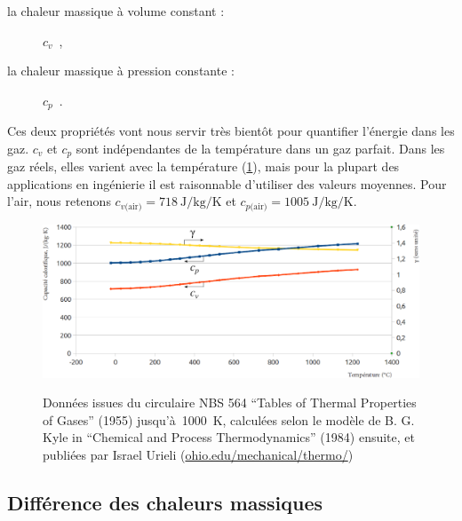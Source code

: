 		\begin{description}
			\item[la chaleur massique à volume constant :]$c_v$~, \dontbreakpage
			\item[la chaleur massique à pression constante :]$c_p$~.
		\end{description}

		Ces deux propriétés vont nous servir très bientôt pour quantifier l’énergie dans les gaz. $c_v$ et $c_p$ sont indépendantes de la température dans un gaz parfait. Dans les gaz réels, elles varient avec la température (\cref{fig_valeurs_de_cp_cv_gamma}), mais pour la plupart des applications en ingénierie il est raisonnable d’utiliser des valeurs moyennes. Pour l’air, nous retenons $c_{v\text{(air)}} = \SI{718}{\joule\per\kilogram\per\kelvin}$ et $c_{p\text{(air)}} = \SI{1005}{\joule\per\kilogram\per\kelvin}$.

		\begin{figure}
			\begin{center}
				\includegraphics[width=15cm, inner]{images/valeurs_cp_cv_air.png}
			\end{center}
				{Données issues du circulaire NBS 564 “Tables of Thermal Properties of Gases” (1955) jusqu’à~\SI{1000}{\kelvin}, calculées selon le modèle de B. G. Kyle in “Chemical and Process Thermodynamics” (1984) ensuite, et publiées par Israel Urieli (\href{http ://www.ohio.edu/mechanical/thermo/}{ohio.edu/mechanical/thermo/})}
		\label{fig_valeurs_de_cp_cv_gamma}
		\end{figure}




	\subsection{Différence des chaleurs massiques}

